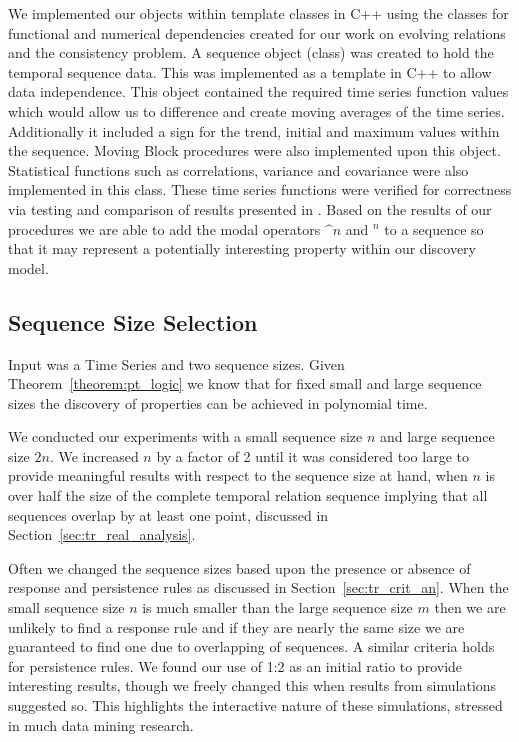 We implemented our objects within template classes in
C++ using the classes for functional and numerical dependencies
created for our work on evolving relations and the consistency
problem. 
A sequence object (class) was created to hold the temporal sequence
data. This was 
implemented as a template in C++ to allow data independence. 
This object contained the required time series function values which
would allow us to difference and create moving averages of the time
series. Additionally it 
included a
sign for the trend, initial and maximum values within the sequence.  
Moving Block procedures were also implemented upon this object.
Statistical functions such as correlations, variance and
covariance were also implemented in this class. 
These time series functions were verified for correctness via
testing and comparison of results presented in \cite{ko90}.
Based on the results of our procedures we are able to add the modal
operators $\bm^n$ and \diam$^n$ to a sequence so that it may represent
a potentially interesting property within our discovery model.


\subsection{Sequence Size Selection}

Input was a Time Series and two sequence sizes.  Given
Theorem~\ref{theorem:pt_logic} we know 
that for fixed small and large sequence sizes the discovery of properties
can be achieved in polynomial time.

We conducted our experiments with a small sequence size $n$ and
large sequence size $2n$. We increased $n$ by a factor of 2 until it
was considered too large to provide meaningful results with respect to
the sequence size at hand, when $n$ is over half the size of the
complete temporal relation sequence implying that all sequences
overlap by at least one point, discussed in
Section~\ref{sec:tr_real_analysis}. 

\medskip


Often we changed the sequence sizes based upon the presence or absence
of response and persistence rules as discussed in
Section~\ref{sec:tr_crit_an}. When the small sequence size $n$ is much
smaller than the large sequence size $m$ then we are unlikely to find
a response rule and if they are nearly the same size we are guaranteed
to find one due to overlapping of sequences. A similar criteria holds
for persistence rules. We found our use of 1:2 as an initial ratio to
provide interesting results, though we freely changed this when
results from simulations suggested so. This highlights the interactive
nature of these simulations, stressed in much data mining research. 


